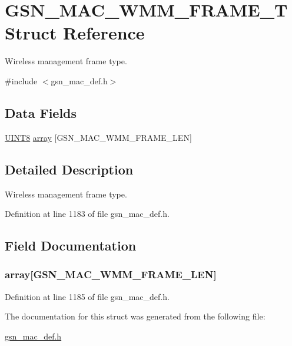 \hypertarget{a00136}{
\section{GSN\_\-MAC\_\-WMM\_\-FRAME\_\-T Struct Reference}
\label{a00136}
}


Wireless management frame type.  




{\ttfamily \#include $<$gsn\_\-mac\_\-def.h$>$}

\subsection*{Data Fields}
\begin{DoxyCompactItemize}
\item 
\hyperlink{a00660_gab27e9918b538ce9d8ca692479b375b6a}{UINT8} \hyperlink{a00136_a9d52b58a48e1b67298e112b0adb2b1b6}{array} \mbox{[}GSN\_\-MAC\_\-WMM\_\-FRAME\_\-LEN\mbox{]}
\end{DoxyCompactItemize}


\subsection{Detailed Description}
Wireless management frame type. 

Definition at line 1183 of file gsn\_\-mac\_\-def.h.



\subsection{Field Documentation}
\hypertarget{a00136_a9d52b58a48e1b67298e112b0adb2b1b6}{
\subsubsection[{array}]{ {\bf array}\mbox{[}GSN\_\-MAC\_\-WMM\_\-FRAME\_\-LEN\mbox{]}}}
\label{a00136_a9d52b58a48e1b67298e112b0adb2b1b6}


Definition at line 1185 of file gsn\_\-mac\_\-def.h.



The documentation for this struct was generated from the following file:\begin{DoxyCompactItemize}
\item 
\hyperlink{a00522}{gsn\_\-mac\_\-def.h}\end{DoxyCompactItemize}
